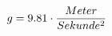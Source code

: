 \documentclass[preview]{standalone}
\begin{document}
\begin{align*}
\special{dvisvgm:raw <g id='unique000'>}g = 9.81 \cdot \frac{Meter}{Sekunde^{2}}\special{dvisvgm:raw </g>}
\end{align*}
\end{document}
